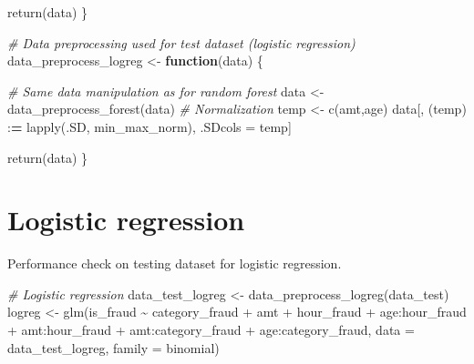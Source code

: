 \documentclass[
]{report}
\newenvironment{Shaded}{\begin{snugshade}}{\end{snugshade}}
\newcommand{\AttributeTok}[1]{\textcolor[rgb]{0.77,0.63,0.00}{#1}}
\newcommand{\CommentTok}[1]{\textcolor[rgb]{0.56,0.35,0.01}{\textit{#1}}}
\newcommand{\ControlFlowTok}[1]{\textcolor[rgb]{0.13,0.29,0.53}{\textbf{#1}}}
\newcommand{\ErrorTok}[1]{\textcolor[rgb]{0.64,0.00,0.00}{\textbf{#1}}}
\newcommand{\FunctionTok}[1]{\textcolor[rgb]{0.00,0.00,0.00}{#1}}
\newcommand{\NormalTok}[1]{#1}
\newcommand{\OtherTok}[1]{\textcolor[rgb]{0.56,0.35,0.01}{#1}}
\newcommand{\SpecialCharTok}[1]{\textcolor[rgb]{0.00,0.00,0.00}{#1}}
\newcommand{\StringTok}[1]{\textcolor[rgb]{0.31,0.60,0.02}{#1}}
\begin{document}
\begin{Shaded}
\begin{Highlighting}[]
  \FunctionTok{return}\NormalTok{(data)}
\NormalTok{\}}

\CommentTok{\# Data preprocessing used for test dataset (logistic regression) }
\NormalTok{data\_preprocess\_logreg }\OtherTok{\textless{}{-}} \ControlFlowTok{function}\NormalTok{(data) \{}
  
  \CommentTok{\# Same data manipulation as for random forest}
\NormalTok{  data }\OtherTok{\textless{}{-}} \FunctionTok{data\_preprocess\_forest}\NormalTok{(data)}
  \CommentTok{\# Normalization}
\NormalTok{  temp }\OtherTok{\textless{}{-}} \FunctionTok{c}\NormalTok{(}\StringTok{\textquotesingle{}amt\textquotesingle{}}\NormalTok{,}\StringTok{\textquotesingle{}age\textquotesingle{}}\NormalTok{)}
\NormalTok{  data[, (temp) }\SpecialCharTok{:}\ErrorTok{=} \FunctionTok{lapply}\NormalTok{(.SD, min\_max\_norm), .SDcols }\OtherTok{=}\NormalTok{ temp]}
  
  \FunctionTok{return}\NormalTok{(data)}
\NormalTok{\}}
\end{Highlighting}
\end{Shaded}

\hypertarget{logistic-regression-2}{%
\section{Logistic regression}\label{logistic-regression-2}}

Performance check on testing dataset for logistic regression.

\begin{Shaded}
\begin{Highlighting}[]
\CommentTok{\# Logistic regression}
\NormalTok{data\_test\_logreg }\OtherTok{\textless{}{-}} \FunctionTok{data\_preprocess\_logreg}\NormalTok{(data\_test)}
\NormalTok{logreg }\OtherTok{\textless{}{-}} \FunctionTok{glm}\NormalTok{(is\_fraud }\SpecialCharTok{\textasciitilde{}} 
\NormalTok{                category\_fraud }\SpecialCharTok{+}\NormalTok{ amt }\SpecialCharTok{+}\NormalTok{ hour\_fraud }\SpecialCharTok{+}\NormalTok{ age}\SpecialCharTok{:}\NormalTok{hour\_fraud }\SpecialCharTok{+}\NormalTok{ amt}\SpecialCharTok{:}\NormalTok{hour\_fraud }\SpecialCharTok{+}\NormalTok{ amt}\SpecialCharTok{:}\NormalTok{category\_fraud }\SpecialCharTok{+}\NormalTok{ age}\SpecialCharTok{:}\NormalTok{category\_fraud,}
              \AttributeTok{data =}\NormalTok{ data\_test\_logreg, }
              \AttributeTok{family =}\NormalTok{ binomial)}
\end{Highlighting}
\end{Shaded}
\end{document}
